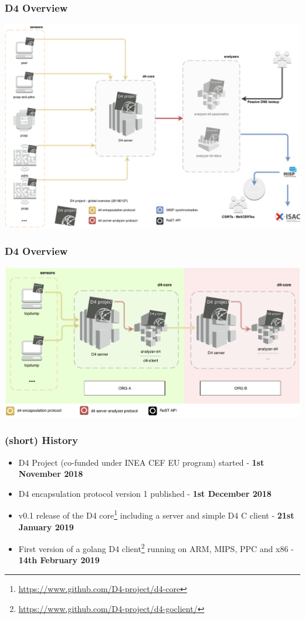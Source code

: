 \documentclass{beamer}
\begin{document}
\begin{frame}
\frametitle{D4 Overview}
        \includegraphics[scale=0.38]{../../diagram/d4-overview.png}
\end{frame}


\begin{frame}
\frametitle{D4 Overview}
        \includegraphics[scale=0.46]{../../diagram/mixing-d4-1.pdf}
\end{frame}


\begin{frame}
        \frametitle{(short) History}
 \begin{itemize}
        \item D4 Project (co-funded under INEA CEF EU program) started - {\bf 1st November 2018}
        \item D4 encapsulation protocol version 1 published  - {\bf 1st December 2018}
        \item v0.1 release of the D4 core\footnote{\url{https://www.github.com/D4-project/d4-core}} including a server and simple D4 C client - {\bf 21st January 2019}
        \item First version of a golang D4
          client\footnote{\url{https://www.github.com/D4-project/d4-goclient/}}
          running on ARM, MIPS, PPC and x86 - {\bf 14th February 2019}
 \end{itemize}
\end{frame}
\end{document}
